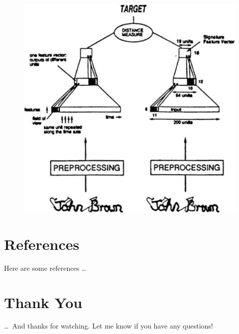 \documentclass[10pt]{article}
\newcommand{\newpar}{\medskip \noindent}
\begin{document}
\begin{figure}
    \centerline{\includegraphics[scale=0.5]{snn.png}}
\end{figure}

\section{References}

\newpar Here are some references \dots

\section{Thank You}

\newpar \ldots\ And thanks for watching. Let me know if you have any questions!
\end{document}

